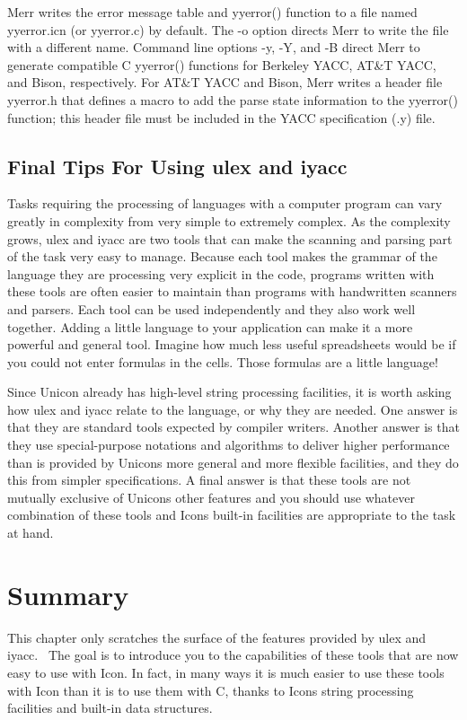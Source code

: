 Merr writes the error message table and \textsf{yyerror()} function to a
file named \textsf{yyerror.icn} (or \textsf{yyerror.c}) by default. The
\textsf{{}-o} option directs Merr to write the file with a different
name. Command line options \textsf{{}-y}, \textsf{{}-Y}, and
\textsf{{}-B} direct Merr to generate compatible C \textsf{yyerror()}
functions for Berkeley YACC, AT\&T YACC, and Bison, respectively. For
AT\&T YACC and Bison, Merr writes a header file \textsf{yyerror.h} that
defines a macro to add the parse state information to the yyerror()
function; this header file must be included in the YACC specification
(.y) file.

\subsection{Final Tips For Using ulex and iyacc}

Tasks requiring the processing of languages with a computer program can
vary greatly in complexity from very simple to extremely complex. As
the complexity grows, \textsf{ulex} and \textsf{iyacc} are two tools
that can make the scanning and parsing part of the task very easy to
manage. Because each tool makes the grammar of the language they are
processing very explicit in the code, programs written with these tools
are often easier to maintain than programs with handwritten scanners
and parsers. Each tool can be used independently and they also work
well together. Adding a little language to your application can make it
a more powerful and general tool. Imagine how much less useful
spreadsheets would be if you could not enter formulas in the cells.
Those formulas are a little language!

Since Unicon already has high-level string processing facilities, it is
worth asking how \textsf{ulex} and \textsf{iyacc} relate to the
language, or why they are needed. One answer is that they are standard
tools expected by compiler writers. Another answer is
that they use special-purpose notations and algorithms to deliver
higher performance than is provided by Unicon{\textquotesingle}s more
general and more flexible facilities, and they do this from simpler
specifications. A final answer is that these tools are not mutually
exclusive of Unicon{\textquotesingle}s other features and you should
use whatever combination of these tools and Icon{\textquotesingle}s
built-in facilities are appropriate to the task at hand.

\section*{Summary}

This chapter only scratches the surface of the features provided by
u\textsf{lex} and \textsf{iyacc}. \ The goal is to introduce you to the
capabilities of these tools that are now easy to use with Icon. In
fact, in many ways it is much easier to use these tools with Icon than
it is to use them with C, thanks to Icon{\textquotesingle}s string
processing facilities and built-in data structures. 

\clearpage
\bigskip

